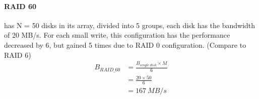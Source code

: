 \documentclass[a4paper,11pt]{article}
\begin{document}
\paragraph{RAID 60} has N = 50 disks in its array, divided into 5 groups, each disk has the bandwidth of 20 MB/s. For each small write, this configuration has the performance decreased by 6, but gained 5 times due to RAID 0 configuration. (Compare to RAID 6)
\begin{equation*}
    \begin{aligned}
        B_{RAID\_60} &= \frac{B_{single\ disk} \times M}{6} \\
        & = \frac{20 \times 50}{6} \\
        & = 167\ MB/s 
    \end{aligned}
\end{equation*}
\end{document}
